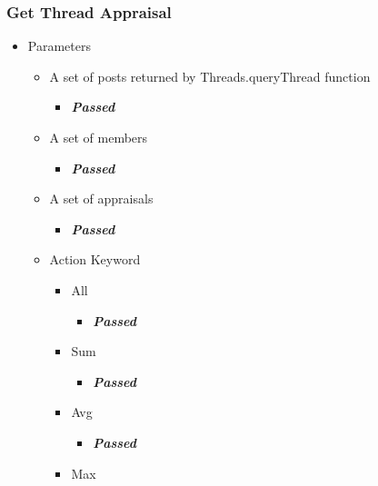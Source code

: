 \subsubsection{Get Thread Appraisal}
\begin{itemize}
	\item Parameters
	\begin{itemize}
		\item A set of posts returned by Threads.queryThread function
			\begin{itemize}
				\item \color{green}\textbf{\small \emph{Passed}} \\\color{black}
			\end{itemize}
		\item A set of members
			\begin{itemize}
				\item \color{green}
\textbf{\small \emph{Passed}} \\\color{black}
			\end{itemize}
		\item A set of appraisals
			\begin{itemize}
				\item \color{green}
\textbf{\small \emph{Passed}} \\
			\end{itemize}
		\item Action Keyword
			\begin{itemize}
				\item All
					\begin{itemize}
						\item \color{green}
\textbf{\small \emph{Passed}} \\\color{black}
					\end{itemize}
				\item Sum
					\begin{itemize}
						\item \color{green}
\textbf{\small \emph{Passed}} \\\color{black}
					\end{itemize}
				\item Avg
					\begin{itemize}
						\item \color{green}
\textbf{\small \emph{Passed}} \\\color{black}
					\end{itemize}
				\item Max
					\begin{itemize}

\end{itemize}
\end{itemize}
\end{itemize}
\end{itemize}
